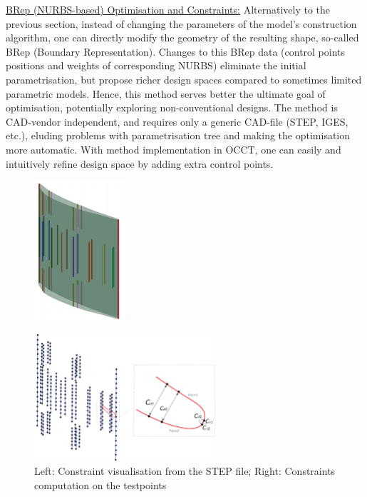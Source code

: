 \documentclass{article}
\begin{document}
\vspace{10pt}
\noindent\underline{BRep (NURBS-based) Optimisation and Constraints:}\vspace{0.2em}\newline
Alternatively to the previous section, instead of changing the parameters of the model's construction algorithm, one can directly modify the geometry of the resulting shape, so-called BRep (Boundary Representation). Changes to this BRep data (control points positions and weights of corresponding NURBS) eliminate the initial parametrisation, but propose richer design spaces compared to sometimes limited parametric models. Hence, this method serves better the ultimate goal of optimisation, potentially exploring non-conventional designs. The method is CAD-vendor independent, and requires only a generic CAD-file (STEP, IGES, etc.), eluding problems with parametrisation tree and making the optimisation more automatic. With method implementation in OCCT, one can easily and intuitively refine design space by adding extra control points. 
\begin{figure}[t!]
\label{fig:constraint}
\begin{center}
\includegraphics[width = 0.3\textwidth]{images/NewCylindersC1.pdf}
~~

\includegraphics[width = 0.6\textwidth]{images/const3.pdf}
\caption{Left: Constraint visualisation from the STEP file; Right: Constraints computation on the testpoints}
\end{center}
\end{figure}
\end{document}
